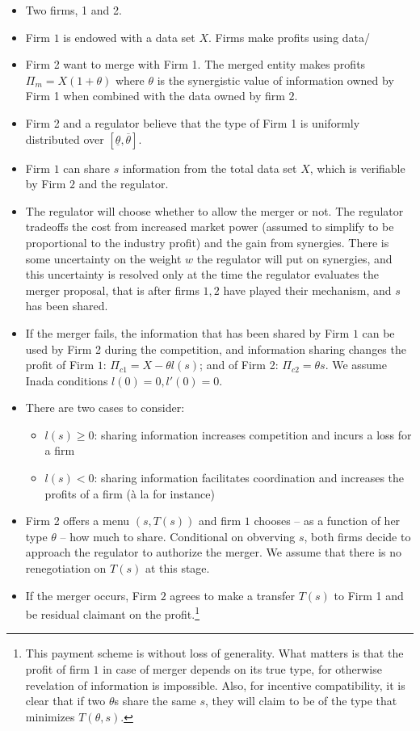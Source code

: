 \documentclass[a4paper]{article}
\renewcommand{\t}{\theta}
\begin{document}
\begin{itemize}
	\item Two firms, 1 and 2. 
	\item Firm $1$ is endowed with a data set $X$. Firms make profits using data/ 
	\item Firm 2 want to merge with Firm 1. The merged entity makes profits $\Pi_m=X(1+\t)$ where $\t$ is the synergistic value of information owned by Firm 1 when combined with the data owned by firm $2$. 
	\item Firm 2 and a regulator believe that the type of Firm 1 is uniformly distributed over $[\underline{\t},\overline{\t}]$.
    \item Firm $1$ can share $s$ information from the total data set $X$, which is verifiable by Firm $2$ and the regulator.
	\item The regulator will choose whether to allow the merger or not. The regulator tradeoffs the cost from increased market power (assumed to simplify to be proportional to the industry profit) and the gain from synergies. There is some uncertainty on the weight $w$ the regulator will put on synergies, and this uncertainty is resolved only at the time the regulator evaluates the merger proposal, that is after firms $1,2$ have played their mechanism, and $s$ has been shared.
	\item If the merger fails, the information that has been shared by Firm $1$ can be used by Firm 2 during the competition, and information sharing changes the profit of Firm $1$: $\Pi_{c1}=X-\theta l(s)$; and of Firm 2: $\Pi_{c2}=\t s$. We assume Inada conditions $l(0)=0,l'(0)=0$.
	\item There are two cases to consider:
\begin{itemize}
    \item $l(s)\geq 0$: sharing information increases competition and incurs a loss for a firm
    \item $l(s)< 0$: sharing information facilitates coordination and increases the profits of a firm (à la \cite{vives1984duopoly} for instance)
 \end{itemize}
    \item Firm 2 offers a menu $(s,T(s))$ and firm $1$ chooses -- as a function of her type $\theta$ -- how much to share. Conditional on obverving $s$, both firms decide to approach the regulator to authorize the merger. We assume that there is no renegotiation on $T(s)$ at this stage.
    \item If the merger occurs, Firm $2$ agrees to make a transfer  $T(s)$ to Firm 1 and be residual claimant on the profit.\footnote{%
    This payment scheme is without loss of generality. What matters is that the profit of firm $1$ in case of merger depends on its true type, for otherwise revelation of information is impossible. Also, for incentive compatibility, it is clear that if two $\theta$s share the same $s$, they will claim to be of the type that minimizes $T(\theta,s)$.}
    
\end{itemize}
\end{document}
